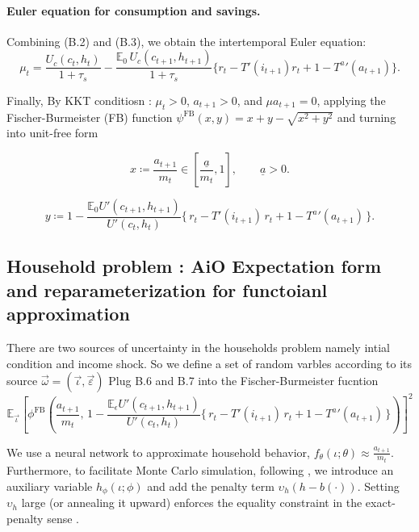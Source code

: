\documentclass[11pt]{article}
\begin{document}
\paragraph{Euler equation for consumption and savings.}
Combining (B.2) and (B.3), we obtain the intertemporal Euler equation:
\begin{equation}
\mu_t 
= \frac{U_c(c_t,h_t)}{1+\tau_s}
- \frac{\mathbb{E}_0 \, U_c(c_{t+1},h_{t+1})}{1+\tau_s}
\Big\{ r_t - T'(i_{t+1})r_t + 1 - {T^a}'(a_{t+1}) \Big\}.
\end{equation}

Finally, By KKT conditiosn : $\mu_t>0$, $a_{t+1}>0$, and $\mu a_{t+1}=0$, applying the Fischer-Burmeister (FB) function $\psi^{\text{FB}}(x, y) = x+y-\sqrt{x^2+y^2} $ and turning into unit-free form 

\begin{equation}
x \coloneqq \frac{a_{t+1}}{m_t}\in [\frac{\underline{a}}{m_t}, 1], 
\qquad \underline{a} > 0.
\end{equation}

\begin{equation}
y \coloneqq 
1 - \frac{\mathbb{E}_0 U'(c_{t+1},h_{t+1})}{U'(c_t,h_t)}
\Big\{\, r_t - T'(i_{t+1})\,r_t + 1 - {T^a}'(a_{t+1}) \,\Big\}.
\end{equation}

\pagebreak

\subsection{Household problem : AiO Expectation form and reparameterization for functoianl approximation}
There are two sources of uncertainty in the households problem namely intial condition and income shock.
So we define a set of random varbles according to its source $\vec{\omega}=(\vec{\iota }, \vec{\varepsilon })$
Plug B.6 and B.7 into the Fischer-Burmeister fucntion
\begin{equation}
\mathbb{E}_{\vec{\iota}} \left[
\phi^{\text{FB}}\!\left(
\frac{a_{t+1}}{m_t},\,
1 - \frac{\mathbb{E}_{\epsilon} U'(c_{t+1},h_{t+1})}{U'(c_t,h_t)}\Big\{\, r_t - T'(i_{t+1})\,r_t + 1 - {T^a}'(a_{t+1}) \,\Big\}
\right)
\right]^{2}
\end{equation}

We use a neural network to approximate household behavior,
$f_\theta(\iota;\theta) \approx \frac{a_{t+1}}{m_t}$. Furthermore, to
facilitate Monte Carlo simulation, following \cite{FiaccoMcCormick1968},
we introduce an auxiliary variable $h_\phi(\iota;\phi)$ and add the
penalty term $\upsilon_h\!\left(h - b(\cdot)\right)$. Setting $\upsilon_h$
large (or annealing it upward) enforces the equality constraint in the
exact-penalty sense \cite{nocedal2006numerical}.

\printbibliography[title={REFERENCES }, heading=bibintoc]
\end{document}

